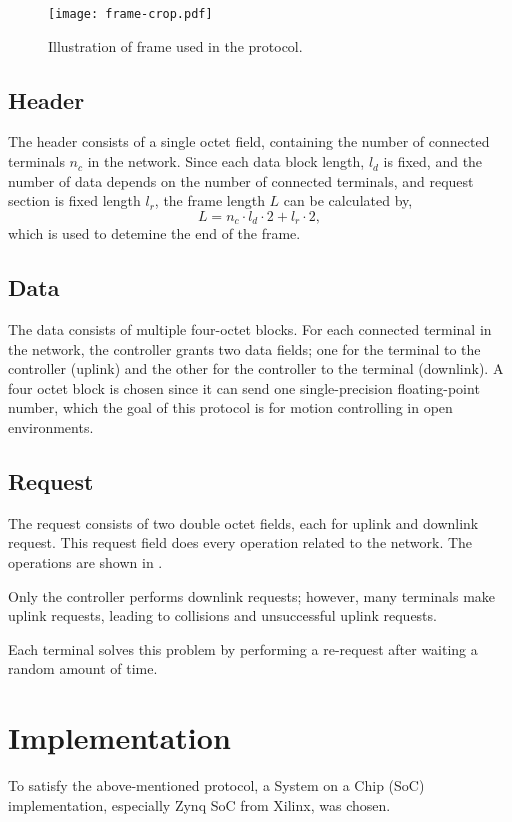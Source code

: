 ﻿\documentclass[twocolumn,9pt]{ltjsarticle}
\renewcommand{\ref}{\Cref}
\begin{document}
\begin{figure}[tb]
  \centering
  \texttt{[image: frame-crop.pdf]}
  \caption{\label{fig:frame}
    Illustration of frame used in the protocol.
  }
\end{figure}

\subsection{Header}
The header consists of a single octet field, containing the number of connected terminals $n_{c}$ in the network.
Since each data block length, $l_d$ is fixed, and the number of data depends on the number of connected terminals, and request section is fixed length $l_r$, the frame length $L$ can be calculated by,
\begin{equation}
  \label{}
  L = n_c \cdot l_d \cdot 2 + l_r \cdot 2,
\end{equation}
which is used to detemine the end of the frame.

\subsection{Data}
The data consists of multiple four-octet blocks.
For each connected terminal in the network, the controller grants two data fields; one for the terminal to the controller (uplink) and the other for the controller to the terminal (downlink).
A four octet block is chosen since it can send one single-precision floating-point number, which the goal of this protocol is for motion controlling in open environments.

\subsection{Request}
The request consists of two double octet fields, each for uplink and downlink request.
This request field does every operation related to the network.
The operations are shown in \ref{tab:request}.

Only the controller performs downlink requests; however, many terminals make uplink requests, leading to collisions and unsuccessful uplink requests.

Each terminal solves this problem by performing a re-request after waiting a random amount of time.
\section{Implementation}
To satisfy the above-mentioned protocol, a System on a Chip (SoC) implementation, especially Zynq SoC from Xilinx\textregistered, was chosen.
\end{document}
